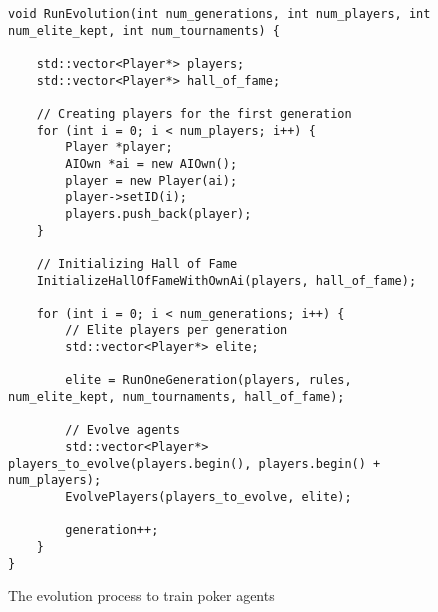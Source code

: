 \begin{figure}
\begin{lstlisting}
void RunEvolution(int num_generations, int num_players, int num_elite_kept, int num_tournaments) {

    std::vector<Player*> players;
    std::vector<Player*> hall_of_fame;

    // Creating players for the first generation
    for (int i = 0; i < num_players; i++) {
        Player *player;
        AIOwn *ai = new AIOwn();
        player = new Player(ai);
        player->setID(i);
        players.push_back(player);
    }

    // Initializing Hall of Fame
    InitializeHallOfFameWithOwnAi(players, hall_of_fame);

    for (int i = 0; i < num_generations; i++) {
        // Elite players per generation
        std::vector<Player*> elite;

        elite = RunOneGeneration(players, rules, num_elite_kept, num_tournaments, hall_of_fame);

        // Evolve agents
        std::vector<Player*> players_to_evolve(players.begin(), players.begin() + num_players);
        EvolvePlayers(players_to_evolve, elite);

        generation++;
    }
}
\end{lstlisting}
\caption{The evolution process to train poker agents}
\label{fig:evol_code}
\end{figure}
